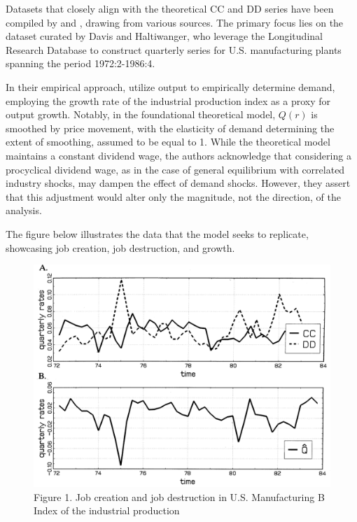 \documentclass[12pt]{report}
\begin{document}
Datasets that closely align with the theoretical CC and DD series have been compiled by 
\cite{DAvHalt90,DavHalt92} and  \cite{BlaDia90}, drawing from various sources. The primary focus
lies on the dataset curated by Davis and Haltiwanger, who leverage the Longitudinal Research Database to construct
quarterly series for U.S. manufacturing plants spanning the period 1972:2-1986:4. 

In their empirical approach, \cite{DavHal94}utilize output to empirically determine demand, employing the growth
rate of the industrial production index as a proxy for output growth. Notably, in the foundational theoretical model,
\(Q(r)\) is smoothed by price movement, with the elasticity of demand determining the extent of smoothing, assumed to be
equal to 1. While the theoretical model maintains a constant dividend wage, the authors acknowledge that considering
a procyclical dividend wage, as in the case of general equilibrium with correlated industry shocks, may dampen the
effect of demand shocks. However, they assert that this adjustment would alter only the magnitude, not the direction, of
the analysis. 

The figure below illustrates the data that the model seeks to replicate, showcasing job creation, job destruction, and growth.

\begin{figure}
    \centering
    \includegraphics[scale = 0.4]{figure/Plot2.2.png}
    \caption{Figure 1. Job creation and job destruction in U.S. Manufacturing B Index of the industrial production}
    \label{plot:2.2}
\end{figure}
\end{document}
